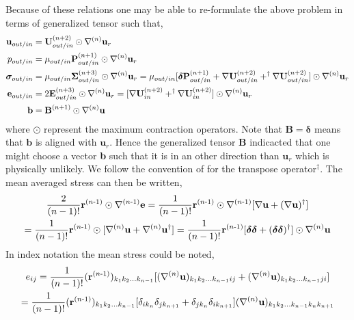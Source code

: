 Because of these relations one may be able to re-formulate the above problem in terms of generalized tensor such that, 
\begin{align}
    \textbf{u}_{out/in} &= \textbf{U}_{out/in}^{(n+2)}\odot \mathbf{\nabla}^{(n)}\textbf{u}_r\\
    p_{out/in} &= \mu_{out/in} \textbf{P}_{out/in}^{(n+1)}\odot \mathbf{\nabla}^{(n)}\textbf{u}_r\\
    \bm\sigma_{out/in}
    &=
    \mu_{out/in} 
    \bm\Sigma^{(n+3)}_{out/in}
    \odot \mathbf{\nabla}^{(n)}\textbf{u}_r
    =
    \mu_{out/in} 
    [
    \bm\delta\textbf{P}_{out/in}^{(n+1)}
    + 
    \mathbf{\nabla} \textbf{U}_{out/in}^{(n+2)}
    + 
    ^\dagger \mathbf{\nabla} \textbf{U}_{out/in}^{(n+2)}]\odot \mathbf{\nabla}^{(n)} \textbf{u}_r\\
    \textbf{e}_{out/in}
    &=
    2\textbf{E}^{(n+3)}_{out/in}
    \odot \mathbf{\nabla}^{(n)}\textbf{u}_r
    =
    [
    \mathbf{\nabla} \textbf{U}_{in}^{(n+2)}
    + 
    ^\dagger \mathbf{\nabla} \textbf{U}_{in}^{(n+2)}]\odot \mathbf{\nabla}^{(n)} \textbf{u}_r\\
    \textbf{b} &=
    \textbf{B}^{(n+1)}\odot \mathbf{\nabla}^{(n)}\textbf{u}
\end{align}
where $\odot$ represent the maximum contraction operators. 
Note that $\textbf{B} = \bm\delta$ means that $\textbf{b}$ is aligned with $\textbf{u}_r$. 
Hence the generalized tensor $\textbf{B}$ indicacted that one might choose a vector \textbf{b} such that it is in an other direction than $\textbf{u}_r$ which is physically unlikely.   
We follow the convention of \citet{brenner1963stokes} for the transpose operator$^\dagger$. 
The mean averaged stress can then be written, 
\begin{multline}
    \frac{2}{(n-1)!}\textbf{r}^\text{($n$-1)}\odot \mathbf{\nabla}^\text{($n$-1)}\textbf{e}
    =
    \frac{1}{(n-1)!}\textbf{r}^\text{($n$-1)}\odot \mathbf{\nabla}^\text{($n$-1)}[\mathbf{\nabla} \textbf{u}+ (\mathbf{\nabla} \textbf{u})^\dagger]\\
    =
    \frac{1}{(n-1)!}\textbf{r}^\text{($n$-1)}\odot [\mathbf{\nabla}^{(n)}\textbf{u} + \mathbf{\nabla}^{(n)}\textbf{u}^\dagger]
    =
    \frac{1}{(n-1)!}\textbf{r}^\text{($n$-1)}[\bm\delta\bm\delta + (\bm\delta\bm\delta)^\dagger] \odot \mathbf{\nabla}^{(n)}\textbf{u}
\end{multline}
In index notation the mean stress could be noted, 
\begin{multline}
    e_{ij}
    =
    \frac{1}{(n-1)!}(\textbf{r}^\text{($n$-1)})_{k_1k_2\ldots k_{n-1}} 
    [(\mathbf{\nabla}^{(n)}\textbf{u})_{k_1k_2\ldots k_{n-1}ij}  + (\mathbf{\nabla}^{(n)}\textbf{u})_{k_1k_2\ldots k_{n-1}ji}]\\
    =
    \frac{1}{(n-1)!}(\textbf{r}^\text{($n$-1)})_{k_1k_2\ldots k_{n-1}} 
    [\delta_{ik_n} \delta_{jk_{n+1}}+ \delta_{jk_n} \delta_{ik_{n+1}}]
    (\mathbf{\nabla}^{(n)}\textbf{u})_{k_1k_2\ldots k_{n-1}k_nk_{n+1}} 
\end{multline}
